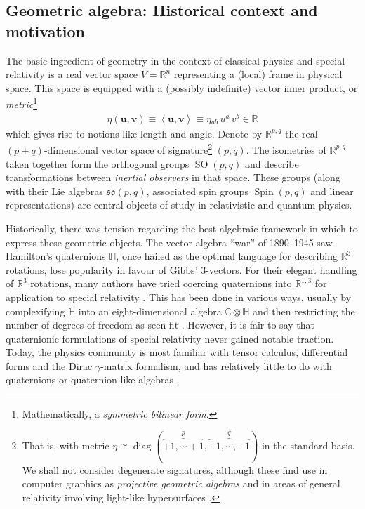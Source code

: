 \documentclass[12pt,a4paper]{article}
\renewcommand{\vb}[1]{\boldsymbol{#1}}
\renewcommand{\ip}[2]{\left\langle#1,#2\right\rangle}
\newcommand{\RR}{\mathds{R}}
\newcommand{\CC}{\mathds{C}}
\newcommand{\HH}{\mathds{H}}
\DeclareMathOperator{\SO}{SO}
\DeclareMathOperator{\Spin}{Spin}
\newcommand{\so}{\mathfrak{so}}
\DeclareMathOperator{\diag}{diag}
\begin{document}
\subsection{Geometric algebra: Historical context and motivation}

The basic ingredient of geometry in the context of classical physics and special relativity is a real vector space $V = \RR^n$ representing a (local) frame in physical space.
This space is equipped with a (possibly indefinite) vector inner product, or \emph{metric}\footnote{
	Mathematically, a \emph{symmetric bilinear form}.
}
\begin{align}
	\eta{}(\vb{u}, \vb{v}) \equiv{} \ip{\vb{u}}{\vb{v}} \equiv{} \eta{}_{ab}\,u^a\,v^b \in \RR	
\end{align}
which gives rise to notions like length and angle.
Denote by $\RR^{p,q}$ the real $(p + q)$-dimensional vector space of signature\footnote{
	That is, with metric $\eta{} \cong \diag(\overbrace{+1,\cdots+1}^p,\overbrace{-1,\cdots,-1}^q)$ in the standard basis.
	We shall not consider degenerate signatures, although these find use in computer graphics as \emph{projective geometric algebras} \cite{hestenes1991pga,vince2008ga-graphics} and in areas of general relativity involving light-like hypersurfaces \cite{poisson2002gr-null-shells,israel1966gr-hypersurfaces}.
} $(p, q)$.
The isometries of $\RR^{p,q}$ taken together form the orthogonal groups $\SO(p,q)$ and describe transformations between \emph{inertial observers} in that space.
These groups (along with their Lie algebras $\so(p,q)$, associated spin groups $\Spin(p,q)$ and linear representations) are central objects of study in relativistic and quantum physics.

Historically, there was tension regarding the best algebraic framework in which to express these geometric objects.
The vector algebra ``war'' of 1890--1945 saw Hamilton's quaternions $\HH$, once hailed as the optimal language for describing $\RR^3$ rotations, lose popularity in favour of Gibbs' 3-vectors.
For their elegant handling of $\RR^3$ rotations, many authors have tried coercing quaternions into $\RR^{1,3}$ for application to special relativity \cite{silberstein1912quat-sr,deleo1996quat-sr,dirac1944quat-sr}.
This has been done in various ways, usually by complexifying $\HH$ into an eight-dimensional algebra $\CC\otimes\HH$ and then restricting the number of degrees of freedom as seen fit \cite{berry2020quat-sr,berry2021quat-sr}.
However, it is fair to say that quaternionic formulations of special relativity never gained notable traction.
Today, the  physics community is most familiar with tensor calculus, differential forms and the Dirac $\gamma{}$-matrix formalism, and has relatively little to do with quaternions or quaternion-like algebras \cite{chappell2016quat-history,altmann1989quat-history}.
\end{document}
